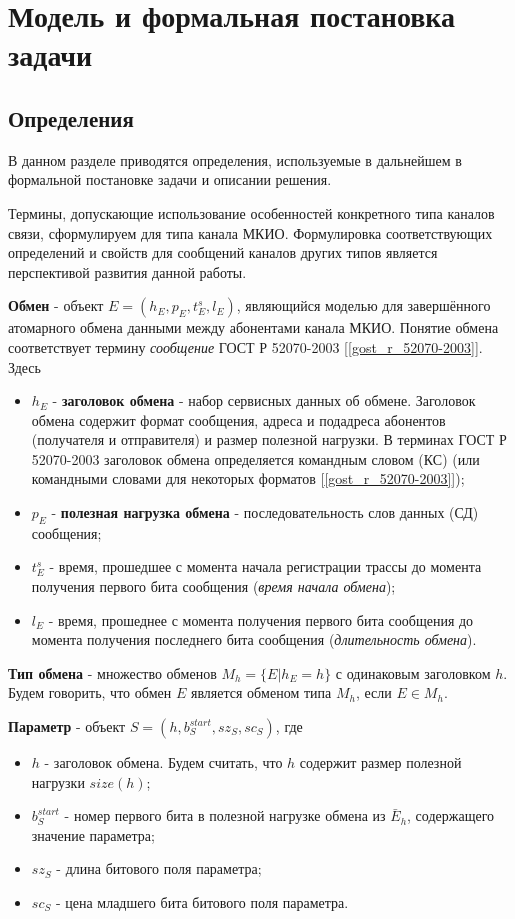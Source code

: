 \section{Модель и формальная постановка задачи}

\subsection{Определения}

В данном разделе приводятся определения, используемые в дальнейшем в 
формальной постановке задачи и описании решения.

Термины, допускающие использование особенностей конкретного типа каналов связи, 
сформулируем для типа канала МКИО. Формулировка соответствующих определений и 
свойств для сообщений каналов других типов является перспективой развития 
данной работы.

\textbf{Обмен} - объект $E = (h_E, p_E, t^s_E, l_E)$, являющийся моделью для 
завершённого атомарного обмена данными между абонентами канала МКИО. Понятие 
обмена соответствует термину \textit{сообщение} ГОСТ Р 52070-2003 
[\ref{gost_r_52070-2003}]. Здесь
\begin{itemize}
 \item $h_E$ - \textbf{заголовок обмена} - набор сервисных данных об обмене. 
 Заголовок обмена содержит формат сообщения, адреса и подадреса абонентов 
(получателя и отправителя) и размер полезной нагрузки. В терминах ГОСТ Р 
52070-2003 заголовок обмена определяется командным словом (КС) (или командными 
словами для некоторых форматов [\ref{gost_r_52070-2003}]);
 \item $p_E$ - \textbf{полезная нагрузка обмена} - последовательность слов 
данных (СД) сообщения;
 \item $t^s_E$ - время, прошедшее с момента начала регистрации трассы до 
момента получения первого бита сообщения (\textit{время начала обмена});
 \item $l_E$ - время, прошеднее с момента получения первого бита сообщения до 
момента получения последнего бита сообщения (\textit{длительность обмена}).
\end{itemize}

\textbf{Тип обмена} - множество обменов $M_h = \{E | h_E = h\}$ с 
одинаковым заголовком $h$. Будем говорить, что обмен $E$ является обменом типа 
$M_h$, если $E \in M_h$.

\textbf{Параметр} - объект $S = (h, b^{start}_S, sz_S, sc_S)$, где

\begin{itemize}
 \item $h$ - заголовок обмена. Будем считать, что $h$ содержит размер полезной 
нагрузки $size(h)$;
 \item $b^{start}_S$ - номер первого бита в полезной нагрузке обмена из 
$\bar{E}_h$, содержащего значение параметра;
 \item $sz_S$ - длина битового поля параметра;
 \item $sc_S$ - цена младшего бита битового поля параметра.
\end{itemize}

